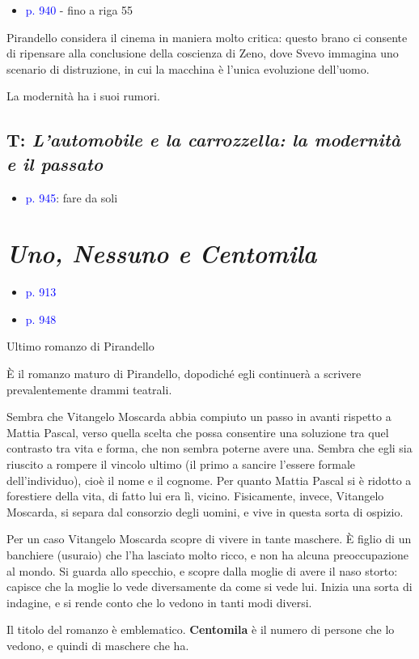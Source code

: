 \documentclass[a4paper, twoside, titlepage]{book}
\newcommand{\elenco}[1]{%
\begin{itemize}
#1
\end{itemize}}
\renewcommand{\emph}[1]{\textcolor{blue}{#1}}
\begin{document}
\elenco{\item \emph{p. 940} - fino a riga 55}

Pirandello considera il cinema in maniera molto critica: questo brano ci consente di ripensare alla conclusione della coscienza di Zeno, dove Svevo immagina uno scenario di distruzione, in cui la macchina è l’unica evoluzione dell’uomo.

La modernità ha i suoi rumori.

\section{T: \textit{L'automobile e la carrozzella: la modernità e il passato}}

\elenco{\item \emph{p. 945}: fare da soli}


\chapter{\textit{Uno, Nessuno e Centomila}}
\elenco{\item \emph{p. 913}
\item \emph{p. 948}}

Ultimo romanzo di Pirandello

È il romanzo maturo di Pirandello, dopodiché egli continuerà a scrivere prevalentemente drammi teatrali.

Sembra che Vitangelo Moscarda abbia compiuto un passo in avanti rispetto a Mattia Pascal, verso quella scelta che possa consentire una soluzione tra quel contrasto tra vita e forma, che non sembra poterne avere una.
Sembra che egli sia riuscito a rompere il vincolo ultimo (il primo a sancire l’essere formale dell’individuo), cioè il nome e il cognome.
Per quanto Mattia Pascal si è ridotto a forestiere della vita, di fatto lui era lì, vicino.
Fisicamente, invece, Vitangelo Moscarda, si separa dal consorzio degli uomini, e vive in questa sorta di ospizio.

Per un caso Vitangelo Moscarda scopre di vivere in tante maschere. È figlio di un banchiere (usuraio) che l’ha lasciato molto ricco, e non ha alcuna preoccupazione al mondo.
Si guarda allo specchio, e scopre dalla moglie di avere il naso storto: capisce che la moglie lo vede diversamente da come si vede lui.
Inizia una sorta di indagine, e si rende conto che lo vedono in tanti modi diversi.

Il titolo del romanzo è emblematico. \textbf{Centomila} è il numero di persone che lo vedono, e quindi di maschere che ha.
\end{document}
